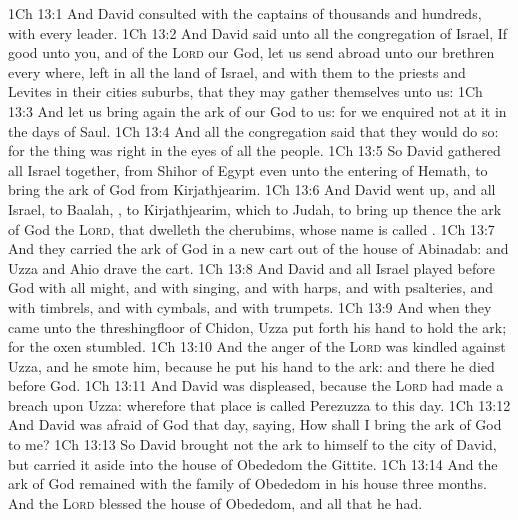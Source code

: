 \vs 1Ch 13:1 And David consulted with the captains of thousands and hundreds,  with every leader.
\vs 1Ch 13:2 And David said unto all the congregation of Israel, If  good unto you, and  of the \textsc{Lord} our God, let us send abroad unto our brethren every where,  left in all the land of Israel, and with them  to the priests and Levites  in their cities  suburbs, that they may gather themselves unto us:
\vs 1Ch 13:3 And let us bring again the ark of our God to us: for we enquired not at it in the days of Saul.
\vs 1Ch 13:4 And all the congregation said that they would do so: for the thing was right in the eyes of all the people.
\vs 1Ch 13:5 So David gathered all Israel together, from Shihor of Egypt even unto the entering of Hemath, to bring the ark of God from Kirjathjearim.
\vs 1Ch 13:6 And David went up, and all Israel, to Baalah, , to Kirjathjearim, which  to Judah, to bring up thence the ark of God the \textsc{Lord}, that dwelleth  the cherubims, whose name is called .
\vs 1Ch 13:7 And they carried the ark of God in a new cart out of the house of Abinadab: and Uzza and Ahio drave the cart.
\vs 1Ch 13:8 And David and all Israel played before God with all  might, and with singing, and with harps, and with psalteries, and with timbrels, and with cymbals, and with trumpets.
\vs 1Ch 13:9 And when they came unto the threshingfloor of Chidon, Uzza put forth his hand to hold the ark; for the oxen stumbled.
\vs 1Ch 13:10 And the anger of the \textsc{Lord} was kindled against Uzza, and he smote him, because he put his hand to the ark: and there he died before God.
\vs 1Ch 13:11 And David was displeased, because the \textsc{Lord} had made a breach upon Uzza: wherefore that place is called Perezuzza to this day.
\vs 1Ch 13:12 And David was afraid of God that day, saying, How shall I bring the ark of God  to me?
\vs 1Ch 13:13 So David brought not the ark  to himself to the city of David, but carried it aside into the house of Obededom the Gittite.
\vs 1Ch 13:14 And the ark of God remained with the family of Obededom in his house three months. And the \textsc{Lord} blessed the house of Obededom, and all that he had.
